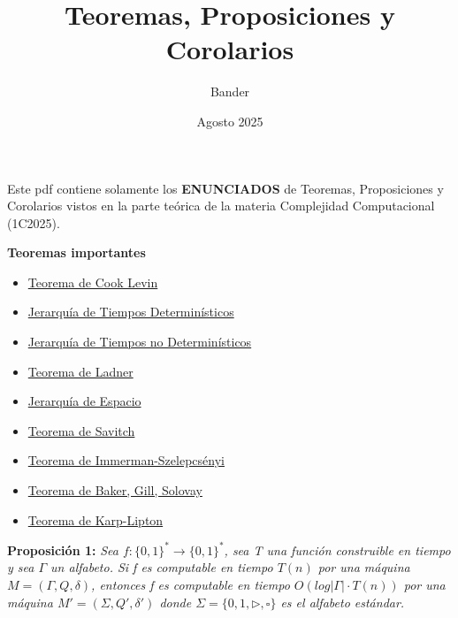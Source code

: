\documentclass{article}
\title{Teoremas, Proposiciones y Corolarios}
\author{Bander}
\date{Agosto 2025}
\begin{document}
\maketitle

\begin{flushleft}
  Este pdf contiene solamente los \textbf{ENUNCIADOS} de Teoremas, Proposiciones y Corolarios vistos
  en la parte teórica de la materia Complejidad Computacional (1C2025).
\end{flushleft}

\begin{flushleft}
  \LARGE \textbf{Teoremas importantes}
\end{flushleft}
\begin{itemize}
  \item \hyperlink{cooklevin}{\textcolor{Bittersweet}{Teorema de Cook Levin}}
  \item \hyperlink{jerTdet}{\textcolor{Bittersweet}{Jerarquía de Tiempos Determinísticos}}
  \item \hyperlink{jerTnodet}{\textcolor{Bittersweet}{Jerarquía de Tiempos no Determinísticos}}
  \item \hyperlink{ladner}{\textcolor{Bittersweet}{Teorema de Ladner}}
  \item \hyperlink{jerEspacio}{\textcolor{Bittersweet}{Jerarquía de Espacio}}
  \item \hyperlink{savitch}{\textcolor{Bittersweet}{Teorema de Savitch}}
  \item \hyperlink{immerman}{\textcolor{Bittersweet}{Teorema de Immerman-Szelepcsényi}}
  \item \hyperlink{baker}{\textcolor{Bittersweet}{Teorema de Baker, Gill, Solovay}}
  \item \hyperlink{karpLipton}{\textcolor{Bittersweet}{Teorema de Karp-Lipton}}
\end{itemize}

\pagebreak

\begin{flushleft}
  \textbf{Proposición 1:} 
  \textit{Sea $f : \{0,1\}^* \rightarrow \{0,1\}^*$, sea T una función construible en
  tiempo y sea $\Gamma$ un alfabeto. Si f es computable en tiempo $T(n)$ por una máquina $M = 
  (\Gamma, Q, \delta)$, entonces f es computable en tiempo $O(log|\Gamma| \cdot T(n))$ por 
  una máquina $M' = (\Sigma, Q', \delta')$ donde $\Sigma = \{0,1,\triangleright, \square \}$
  es el alfabeto estándar.}\\[0.5em]
\end{flushleft}
\end{document}
